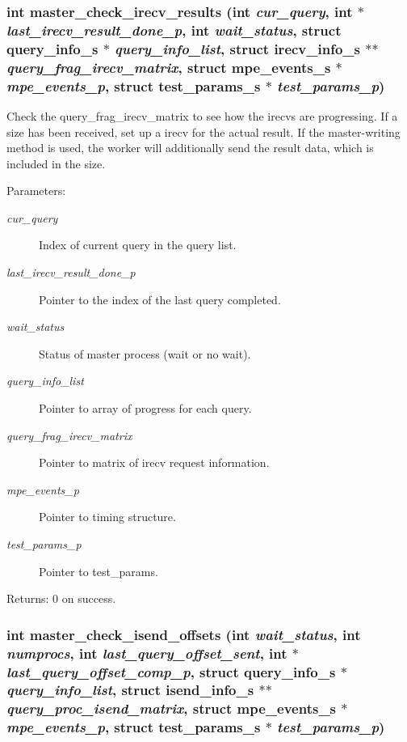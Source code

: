 \subsubsection{\setlength{\rightskip}{0pt plus 5cm}int master\_\-check\_\-irecv\_\-results (int {\em cur\_\-query}, int $\ast$ {\em last\_\-irecv\_\-result\_\-done\_\-p}, int {\em wait\_\-status}, struct \bf{query\_\-info\_\-s} $\ast$ {\em query\_\-info\_\-list}, struct \bf{irecv\_\-info\_\-s} $\ast$$\ast$ {\em query\_\-frag\_\-irecv\_\-matrix}, struct \bf{mpe\_\-events\_\-s} $\ast$ {\em mpe\_\-events\_\-p}, struct \bf{test\_\-params\_\-s} $\ast$ {\em test\_\-params\_\-p})}\label{master__help_8h_ea8d2bd2e0ac0e51fe229c9f49d96cf2}


Check the query\_\-frag\_\-irecv\_\-matrix to see how the irecvs are progressing. If a size has been received, set up a irecv for the actual result. If the master-writing method is used, the worker will additionally send the result data, which is included in the size.

\begin{Desc}
\item[Parameters:]
\begin{description}
\item[{\em cur\_\-query}]Index of current query in the query list. \item[{\em last\_\-irecv\_\-result\_\-done\_\-p}]Pointer to the index of the last query completed. \item[{\em wait\_\-status}]Status of master process (wait or no wait). \item[{\em query\_\-info\_\-list}]Pointer to array of progress for each query. \item[{\em query\_\-frag\_\-irecv\_\-matrix}]Pointer to matrix of irecv request information. \item[{\em mpe\_\-events\_\-p}]Pointer to timing structure. \item[{\em test\_\-params\_\-p}]Pointer to test\_\-params. \end{description}
\end{Desc}
\begin{Desc}
\item[Returns:]0 on success. \end{Desc}
\subsubsection{\setlength{\rightskip}{0pt plus 5cm}int master\_\-check\_\-isend\_\-offsets (int {\em wait\_\-status}, int {\em numprocs}, int {\em last\_\-query\_\-offset\_\-sent}, int $\ast$ {\em last\_\-query\_\-offset\_\-comp\_\-p}, struct \bf{query\_\-info\_\-s} $\ast$ {\em query\_\-info\_\-list}, struct \bf{isend\_\-info\_\-s} $\ast$$\ast$ {\em query\_\-proc\_\-isend\_\-matrix}, struct \bf{mpe\_\-events\_\-s} $\ast$ {\em mpe\_\-events\_\-p}, struct \bf{test\_\-params\_\-s} $\ast$ {\em test\_\-params\_\-p})}\label{master__help_8h_26e7ba48ee59e0d69e0b73a81e65e161}


